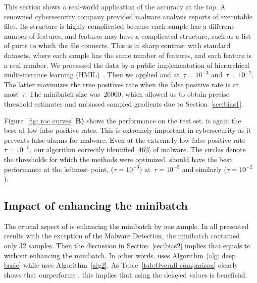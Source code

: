 This section shows a real-world application of the accuracy at the top. A renowned cybersecurity company provided malware analysis reports of executable files. Its structure is highly complicated because each sample has a different number of features, and features may have a complicated structure, such as a list of ports to which the file connects. This is in sharp contrast with standard datasets, where each sample has the same number of features, and each feature is a real number. We processed the data by a public implementation of hierarchical multi-instance learning (HMIL)~\cite{pevny2017using}. Then we applied \DeepTopPush and \PatMatNP at~$\tau=10^{-3}$ and~$\tau=10^{-2}$. The latter maximizes the true positives rate when the false positive rate is at most~$\tau$. The minibatch size was~$20000$, which allowed us to obtain precise threshold estimates and unbiased sampled gradients due to Section~\ref{sec:bias1}.

Figure~\ref{fig: roc curves} \textbf{B)} shows the performance on the test set. \DeepTopPush is again the best at low false positive rates. This is extremely important in cybersecurity as it prevents false alarms for malware. Even at the extremely low false positive rate~$\tau=10^{-5}$, our algorithm correctly identified~$46\%$ of malware. The circles denote the thresholds for which the methods were optimized. \DeepTopPush should have the best performance at the leftmost point, \PatMatNP ($\tau=10^{-3}$) at~$\tau=10^{-3}$ and similarly \PatMatNP($\tau=10^{-2}$).

\subsection{Impact of enhancing the minibatch}\label{sec:delay}

The crucial aspect of \DeepTopPush is enhancing the minibatch by one sample. In all presented results with the exception of the Malware Detection, the minibatch contained only 32 samples. Then the discussion in Section~\ref{sec:bias2} implies that \PatMatNP equals to \DeepTopPush without enhancing the minibatch. In other words, \PatMatNP uses Algorithm~\ref{alg: deep basic} while \DeepTopPush uses Algorithm~\ref{alg2}. As Table~\ref{tab:Overall comparison} clearly shows that \DeepTopPush ourperforms \PatMatNP, this implies that using the delayed values is beneficial.

